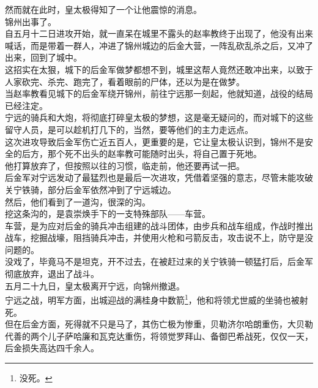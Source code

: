 \begin{multicols}{\theparacolNo}
然而就在此时，皇太极得知了一个让他震惊的消息。\\

锦州出事了。\\

自五月十二日进攻开始，就一直呆在城里不露头的赵率教终于出现了，他没有出来喊话，而是带着一群人，冲进了锦州城边的后金大营，一阵乱砍乱杀之后，又冲了出来，回到了城中。\\

这招实在太狠，城下的后金军做梦都想不到，城里这帮人竟然还敢冲出来，以致于人家砍完、杀完、跑完了，看着眼前的尸体，还以为是在做梦。\\

当赵率教看见城下的后金军绕开锦州，前往宁远那一刻起，他就知道，战役的结局已经注定。\\

宁远的骑兵和大炮，将彻底打碎皇太极的梦想，这是毫无疑问的，而对城下的这些留守人员，是可以趁机打几下的，当然，要等他们的主力走远点。\\

这次进攻导致后金军伤亡近五百人，更重要的是，它让皇太极认识到，锦州不是安全的后方，那个死不出头的赵率教可能随时出头，将自己置于死地。\\

他打算放弃了，但按照以往的习惯，临走前，他还要再试一把。\\

后金军对宁远发动了最猛烈也是最后一次进攻，凭借着坚强的意志，尽管未能攻破关宁铁骑，部分后金军依然冲到了宁远城边。\\

然后，他们看到了一道沟，很深的沟。\\

挖这条沟的，是袁崇焕手下的一支特殊部队——车营。\\

车营，是为应对后金的骑兵冲击组建的战斗团体，由步兵和战车组成，作战时推出战车，挖掘战壕，阻挡骑兵冲击，并使用火枪和弓箭反击，攻击说不上，防守是没问题的。\\

没戏了，毕竟马不是坦克，开不过去，在被赶过来的关宁铁骑一顿猛打后，后金军彻底放弃，退出了战斗。\\

五月二十九日，皇太极离开宁远，向锦州撤退。\\

宁远之战，明军方面，出城迎战的满桂身中数箭\footnote{没死。}，他和将领尤世威的坐骑也被射死。\\

但在后金方面，死得就不只是马了，其伤亡极为惨重，贝勒济尔哈朗重伤，大贝勒代善的两个儿子萨哈廉和瓦克达重伤，将领觉罗拜山、备御巴希战死，仅仅一天，后金损失高达四千余人。\\


\end{multicols}
